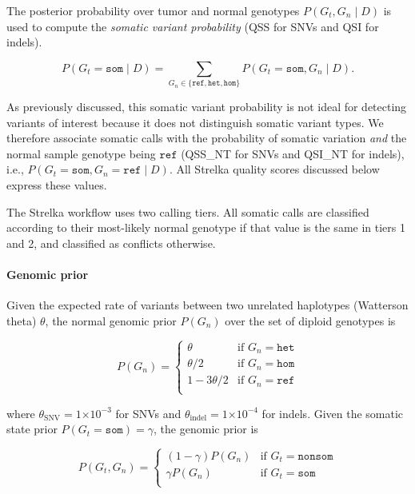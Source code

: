 \documentclass{article}
\newcommand{\e}[1]{\ensuremath{\times 10^{#1}}}
\begin{document}
The posterior probability over tumor and normal genotypes $P(G_t,G_n \mid D)$ is used to compute the {\em somatic variant probability} (QSS for SNVs and QSI for indels).

\begin{equation}
\label{eqn:somVarProb}
	P(G_t = \texttt{som} \mid D) = \sum_{G_n \in \{ \texttt{ref}, \texttt{het}, \texttt{hom} \}}{P(G_t=\texttt{som},G_n \mid D)}.
\end{equation}

As previously discussed, this somatic variant probability is not ideal for detecting variants of interest because it does not distinguish somatic variant types. We therefore associate somatic calls with the probability of somatic variation {\em and} the normal sample genotype being $\texttt{ref}$ (QSS\_NT for SNVs and QSI\_NT for indels), i.e., $P(G_t = \texttt{som}, G_n = \texttt{ref} \mid D)$. All Strelka quality scores discussed below express these values.

The Strelka workflow uses two calling tiers. All somatic calls are classified according to their most-likely normal genotype if that value is the same in tiers 1 and 2, and classified as conflicts otherwise.

\paragraph{Genomic prior}
Given the expected rate of variants between two unrelated haplotypes (Watterson theta) $\theta$, the normal genomic prior $P(G_n)$ over the set of diploid genotypes is

\begin{equation*}
P(G_n)=
\begin{cases}
	\theta & \text{if } G_n = \texttt{het} \\
	\theta/2 & \text{if } G_n = \texttt{hom} \\
	1 - 3\theta/2 & \text{if } G_n = \texttt{ref} \\
\end{cases}
\end{equation*}

\noindent where $\theta_{\text{SNV}}=1\e{-3}$ for SNVs and $\theta_{\text{indel}}=1\e{-4}$ for indels. Given the somatic state prior $P(G_t=\texttt{som}) = \gamma$, the genomic prior is

\begin{equation*}
P(G_t, G_n)=
\begin{cases}
	(1 - \gamma) P(G_n) & \text{if } G_t = \texttt{nonsom} \\
	\gamma P(G_n) & \text{if } G_t = \texttt{som} \\
\end{cases}
\end{equation*}
\end{document}
